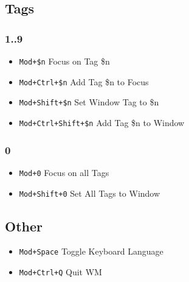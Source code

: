 \documentclass{cheatsheet}
\newcommand{\bind}[2]{\item \texttt{#1} #2}
\begin{document}
\subsection{Tags}
\subsubsection{1..9}
\begin{itemize}
\bind{Mod+\$n}{Focus on Tag \$n}
\bind{Mod+Ctrl+\$n}{Add Tag \$n to Focus}
    
\bind{Mod+Shift+\$n}{Set Window Tag to \$n}
\bind{Mod+Ctrl+Shift+\$n}{Add Tag \$n to Window}
\end{itemize}

\subsubsection{0}
\begin{itemize}
\bind{Mod+0}{Focus on all Tags}
\bind{Mod+Shift+0}{Set All Tags to Window}
\end{itemize}

\subsection{Other}
\begin{itemize}
\bind{Mod+Space}{Toggle Keyboard Language}
\bind{Mod+Ctrl+Q}{Quit WM}
\end{itemize}
\end{document}
